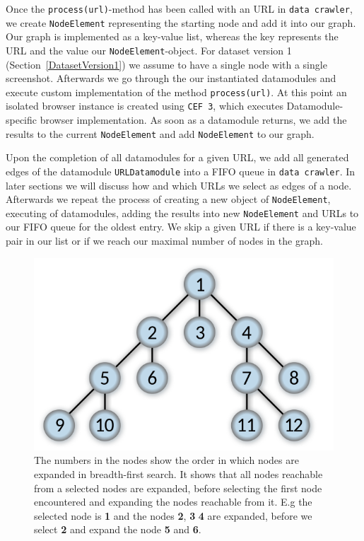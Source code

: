 Once the \texttt{process(url)}-method has been called with an URL in \texttt{data crawler}, we create \texttt{NodeElement} representing the starting node and add it into our graph. Our graph is implemented as a key-value list, whereas the key represents the URL and the value our \texttt{NodeElement}-object. For dataset version 1 (Section~\ref{DatasetVersion1}) we assume to have a single node with a single screenshot. Afterwards we go through the our instantiated datamodules and execute custom implementation of the method \texttt{process(url)}. At this point an isolated browser instance is created using \texttt{CEF 3}, which executes Datamodule-specific browser implementation. As soon as a datamodule returns, we add the results to the current \texttt{NodeElement} and add \texttt{NodeElement} to our graph. 

Upon the completion of all datamodules for a given URL, we add all generated edges of the datamodule \texttt{URLDatamodule} into a FIFO queue in \texttt{data crawler}. In later sections we will discuss how and which URLs we select as edges of a node. Afterwards we repeat the process of creating a new object of \texttt{NodeElement}, executing of datamodules, adding the results into new \texttt{NodeElement} and URLs to our FIFO queue for the oldest entry. We skip a given URL if there is a key-value pair in our list or if we reach our maximal number of nodes in the graph.

\begin{figure}
	\centering
	\includegraphics[scale=0.35]{resources/breadth-first}
	\caption[Illustration of the breadth-first search algorithm]{ The numbers in the nodes show the order in which nodes are expanded in breadth-first search. It shows that all nodes reachable from a selected nodes are expanded, before selecting the first node encountered and expanding the nodes reachable from it. E.g the selected node is \textbf{1} and the nodes \textbf{2}, \textbf{3} \textbf{4} are expanded, before we select \textbf{2} and expand the node \textbf{5} and \textbf{6}.}
	\label{datacrawler_breadth_search}
\end{figure}

